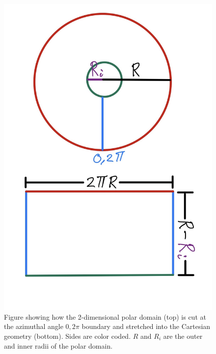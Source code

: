 \documentclass{article}
\begin{document}
\begin{figure}[H]
	\centering
	\includegraphics[scale=0.25]{unrap image.jpg}
	\caption{Figure showing how the 2-dimensional polar domain (top) is cut at the azimuthal angle $0, 2\pi$ boundary and stretched into the Cartesian geometry (bottom). Sides are color coded. $R$ and $R_i$ are the outer and inner radii of the polar domain.} 
	\label{unrolling}
\end{figure}
\end{document}
